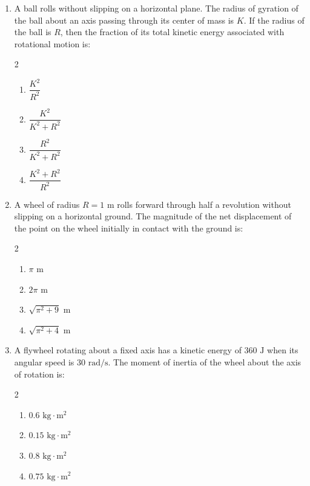 \documentclass[11pt,a4paper]{article}
\begin{document}
\begin{enumerate}[label=\textbf{Q\arabic*.},leftmargin=24pt,itemsep=12pt]
  \item A ball rolls without slipping on a horizontal plane. The radius of gyration of the ball about an axis passing through its center of mass is $K$. If the radius of the ball is $R$, then the fraction of its total kinetic energy associated with rotational motion is:
  \begin{multicols}{2}
  \begin{enumerate}[label=(\Alph*),itemsep=2pt]
    \item $\dfrac{K^2}{R^2}$
    \item $\dfrac{K^2}{K^2 + R^2}$
    \item $\dfrac{R^2}{K^2 + R^2}$
    \item $\dfrac{K^2 + R^2}{R^2}$
  \end{enumerate}
  \end{multicols}

  \item A wheel of radius $R = 1\text{ m}$ rolls forward through half a revolution without slipping on a horizontal ground. The magnitude of the net displacement of the point on the wheel initially in contact with the ground is:
  \begin{multicols}{2}
  \begin{enumerate}[label=(\Alph*),itemsep=2pt]
    \item $\pi\text{ m}$
    \item $2\pi\text{ m}$
    \item $\sqrt{\pi^2 + 9}\text{ m}$
    \item $\sqrt{\pi^2 + 4}\text{ m}$
  \end{enumerate}
  \end{multicols}

  \item A flywheel rotating about a fixed axis has a kinetic energy of $360\text{ J}$ when its angular speed is $30\text{ rad/s}$. The moment of inertia of the wheel about the axis of rotation is:
  \begin{multicols}{2}
  \begin{enumerate}[label=(\Alph*),itemsep=2pt]
    \item $0.6\text{ kg}\cdot\text{m}^2$
    \item $0.15\text{ kg}\cdot\text{m}^2$
    \item $0.8\text{ kg}\cdot\text{m}^2$
    \item $0.75\text{ kg}\cdot\text{m}^2$
  \end{enumerate}
  \end{multicols}


\end{enumerate}
\end{document}
